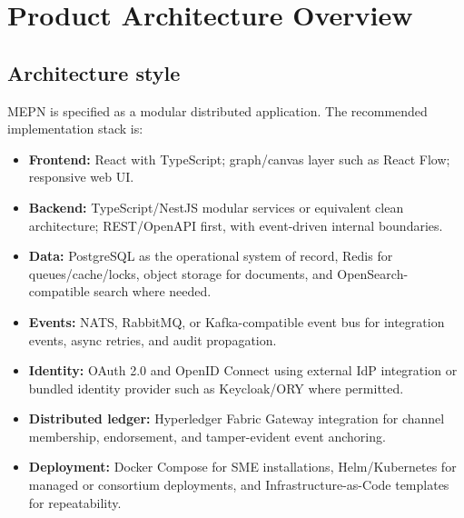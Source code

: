 \documentclass[11pt,a4paper]{article}
\newcommand{\systemshort}{MEPN}
\begin{document}
\section{Product Architecture Overview}

\subsection{Architecture style}
\systemshort{} is specified as a modular distributed application. The recommended implementation stack is:
\begin{itemize}
  \item \textbf{Frontend:} React with TypeScript; graph/canvas layer such as React Flow; responsive web UI.
  \item \textbf{Backend:} TypeScript/NestJS modular services or equivalent clean architecture; REST/OpenAPI first, with event-driven internal boundaries.
  \item \textbf{Data:} PostgreSQL as the operational system of record, Redis for queues/cache/locks, object storage for documents, and OpenSearch-compatible search where needed.
  \item \textbf{Events:} NATS, RabbitMQ, or Kafka-compatible event bus for integration events, async retries, and audit propagation.
  \item \textbf{Identity:} OAuth 2.0 and OpenID Connect using external IdP integration or bundled identity provider such as Keycloak/ORY where permitted.
  \item \textbf{Distributed ledger:} Hyperledger Fabric Gateway integration for channel membership, endorsement, and tamper-evident event anchoring.
  \item \textbf{Deployment:} Docker Compose for SME installations, Helm/Kubernetes for managed or consortium deployments, and Infrastructure-as-Code templates for repeatability.
\end{itemize}
\end{document}
